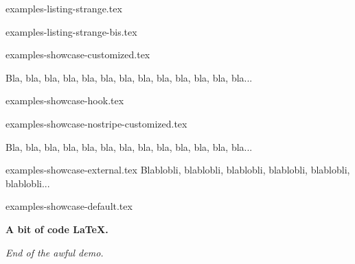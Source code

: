 \begin{filecontents*}[overwrite]{examples-listing-strange.tex}
\begin{tdoclatex}
\end{tdoclatex}
\end{filecontents*}


\begin{filecontents*}[overwrite]{examples-listing-strange-bis.tex}
\begin{tdoclatex}
\end{tdoclatex}
\end{filecontents*}


\begin{filecontents*}[overwrite]{examples-showcase-customized.tex}
\begin{tdocshowcase}[before     = My beginning,
                     after      = My end,
                     col-stripe = red,
                     col-text   = orange!75!black]
    Bla, bla, bla, bla, bla, bla, bla, bla, bla, bla, bla, bla, bla...
\end{tdocshowcase}
\end{filecontents*}


\begin{filecontents*}[overwrite]{examples-showcase-hook.tex}
\begin{tdocshowcase}
\end{tdocshowcase}
\end{filecontents*}


\begin{filecontents*}[overwrite]{examples-showcase-nostripe-customized.tex}
\begin{tdocshowcase}[nostripe,
                     before     = My beginning,
                     after      = My end,
                     col-stripe = green,
                     col-text   = purple]
    Bla, bla, bla, bla, bla, bla, bla, bla, bla, bla, bla, bla, bla...
\end{tdocshowcase}
\end{filecontents*}


\begin{filecontents*}[overwrite]{examples-showcase-external.tex}
Blablobli, blablobli, blablobli, blablobli, blablobli, blablobli...
\end{filecontents*}


\begin{filecontents*}[overwrite]{examples-showcase-default.tex}
\begin{tdocshowcase}
    \bfseries A bit of code \LaTeX.

    \bigskip

    \emph{\large End of the awful demo.}
\end{tdocshowcase}
\end{filecontents*}


